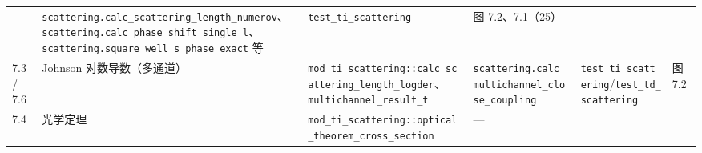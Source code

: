 \documentclass[
]{ctexbook}
\begin{document}
\begin{longtable}[]{@{}llllll@{}}
\begin{minipage}[t]{0.14\columnwidth}
\end{minipage} & \begin{minipage}[t]{0.14\columnwidth}\raggedright
\texttt{scattering.calc\_scattering\_length\_numerov}、\texttt{scattering.calc\_phase\_shift\_single\_l}、\texttt{scattering.square\_well\_s\_phase\_exact}
等\strut
\end{minipage} & \begin{minipage}[t]{0.14\columnwidth}\raggedright
\texttt{test\_ti\_scattering}\strut
\end{minipage} & \begin{minipage}[t]{0.14\columnwidth}\raggedright
图 7.2、7.1（25）\strut
\end{minipage}\tabularnewline
\begin{minipage}[t]{0.14\columnwidth}\raggedright
7.3 / 7.6\strut
\end{minipage} & \begin{minipage}[t]{0.14\columnwidth}\raggedright
Johnson 对数导数（多通道）\strut
\end{minipage} & \begin{minipage}[t]{0.14\columnwidth}\raggedright
\texttt{mod\_ti\_scattering::calc\_scattering\_length\_logder}、\texttt{multichannel\_result\_t}\strut
\end{minipage} & \begin{minipage}[t]{0.14\columnwidth}\raggedright
\texttt{scattering.calc\_multichannel\_close\_coupling}\strut
\end{minipage} & \begin{minipage}[t]{0.14\columnwidth}\raggedright
\texttt{test\_ti\_scattering}/\texttt{test\_td\_scattering}\strut
\end{minipage} & \begin{minipage}[t]{0.14\columnwidth}\raggedright
图 7.2\strut
\end{minipage}\tabularnewline
\begin{minipage}[t]{0.14\columnwidth}\raggedright
7.4\strut
\end{minipage} & \begin{minipage}[t]{0.14\columnwidth}\raggedright
光学定理\strut
\end{minipage} & \begin{minipage}[t]{0.14\columnwidth}\raggedright
\texttt{mod\_ti\_scattering::optical\_theorem\_cross\_section}\strut
\end{minipage} & \begin{minipage}[t]{0.14\columnwidth}\raggedright
---\strut
\end{minipage} & \begin{minipage}[t]{0.14\columnwidth}\raggedright

\end{minipage}
\end{longtable}
\end{document}
